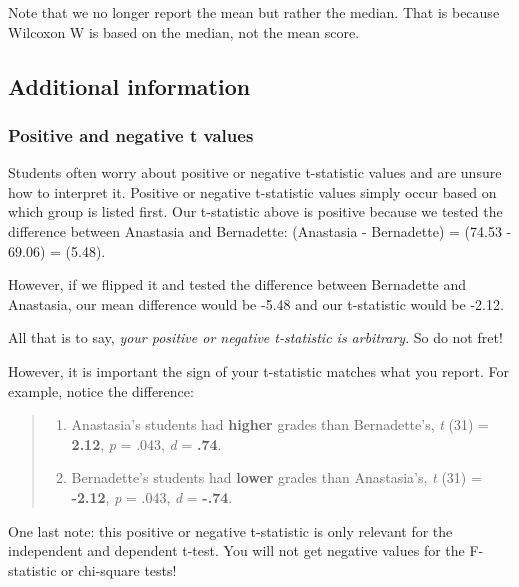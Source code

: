 \documentclass[
]{book}
\providecommand{\tightlist}{%
  \setlength{\itemsep}{0pt}\setlength{\parskip}{0pt}}
\begin{document}
Note that we no longer report the mean but rather the median. That is because Wilcoxon W is based on the median, not the mean score.

\hypertarget{additional-information}{%
\subsection{Additional information}\label{additional-information}}

\hypertarget{positive-and-negative-t-values}{%
\subsubsection{Positive and negative t values}\label{positive-and-negative-t-values}}

Students often worry about positive or negative t-statistic values and are unsure how to interpret it. Positive or negative t-statistic values simply occur based on which group is listed first. Our t-statistic above is positive because we tested the difference between Anastasia and Bernadette: (Anastasia - Bernadette) = (74.53 - 69.06) = (5.48).

However, if we flipped it and tested the difference between Bernadette and Anastasia, our mean difference would be -5.48 and our t-statistic would be -2.12.

All that is to say, \emph{your positive or negative t-statistic is arbitrary}. So do not fret!

However, it is important the sign of your t-statistic matches what you report. For example, notice the difference:

\begin{quote}
\begin{enumerate}
\def\labelenumi{\arabic{enumi}.}
\tightlist
\item
  Anastasia's students had \textbf{higher} grades than Bernadette's, \emph{t} (31) = \textbf{2.12}, \emph{p} = .043, \emph{d} = \textbf{.74}.
\item
  Bernadette's students had \textbf{lower} grades than Anastasia's, \emph{t} (31) = \textbf{-2.12}, \emph{p} = .043, \emph{d} = \textbf{-.74}.
\end{enumerate}
\end{quote}

One last note: this positive or negative t-statistic is only relevant for the independent and dependent t-test. You will not get negative values for the F-statistic or chi-square tests!
\end{document}
